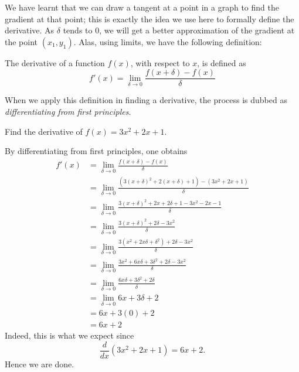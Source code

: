 We have learnt that we can draw a tangent at a point in a graph to find the gradient at that point; this is exactly
the idea we use here to formally define the derivative. As $\delta$ tends to $0$, we will get a better approximation
of the gradient at the point $(x_1, y_1)$. Alas, using limits, we have the following definition:

\begin{definition}
    The derivative of a function $f(x)$, with respect to $x$, is defined as
    \[f'(x) = \lim_{\delta \to 0} \frac{f(x + \delta) - f(x)}{\delta}\]
\end{definition}

When we apply this definition in finding a derivative, the process is dubbed as \textit{differentiating
from first principles}.

\begin{example}
    Find the derivative of $f(x) = 3x^2 + 2x + 1$.
\end{example}
\begin{solution}
    By differentiating from first principles, one obtains
    \begin{equation*}
        \begin{split}
            f'(x) &= \lim_{\delta \to 0} \frac{f(x + \delta) - f(x)}{\delta} \\
            &= \lim_{\delta \to 0} \frac{(3(x + \delta)^2 + 2(x + \delta) + 1) - (3x^2 + 2x + 1)}{\delta} \\
            &= \lim_{\delta \to 0} \frac{3(x + \delta)^2 + 2x + 2\delta + 1 - 3x^2 - 2x - 1}{\delta} \\
            &= \lim_{\delta \to 0} \frac{3(x + \delta)^2 + 2\delta - 3x^2}{\delta} \\
            &= \lim_{\delta \to 0} \frac{3(x^2 + 2x\delta + \delta^2) + 2\delta - 3x^2}{\delta} \\
            &= \lim_{\delta \to 0} \frac{3x^2 + 6x\delta + 3\delta^2 + 2\delta - 3x^2}{\delta} \\
            &= \lim_{\delta \to 0} \frac{6x\delta + 3\delta^2 + 2\delta}{\delta} \\
            &= \lim_{\delta \to 0} 6x + 3\delta + 2 \\
            &= 6x + 3(0) + 2 \\
            &= 6x + 2
        \end{split}
    \end{equation*}
    Indeed, this is what we expect since \[\frac{d}{dx}(3x^2 + 2x + 1) = 6x + 2.\]
    Hence we are done.
\end{solution}